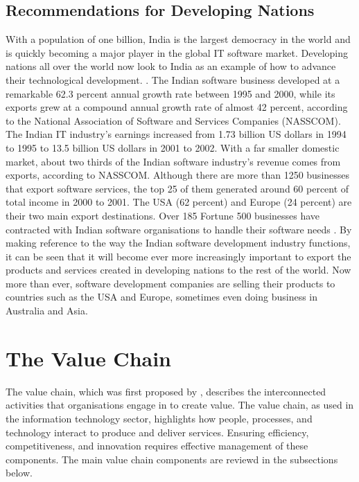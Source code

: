 \subsection{Recommendations for Developing Nations}
\par{With a population of one billion, India is the largest democracy in the world and is quickly becoming a major player in the global IT software market. Developing nations all over the world now look to India as an example of how to advance their technological development. \citep{tschang2001basic}. The Indian software business developed at a remarkable 62.3 percent annual growth rate between 1995 and 2000, while its exports grew at a compound annual growth rate of almost 42 percent, according to the National Association of Software and Services Companies (NASSCOM). The Indian IT industry's earnings increased from 1.73 billion US dollars in 1994 to 1995 to 13.5 billion US dollars in 2001 to 2002. With a far smaller domestic market, about two thirds of the Indian software industry's revenue comes from exports, according to NASSCOM. Although there are more than 1250 businesses that export software services, the top 25 of them generated around 60 percent of total income in 2000 to 2001. The USA (62 percent) and Europe (24 percent) are their two main export destinations. Over 185 Fortune 500 businesses have contracted with Indian software organisations to handle their software needs \citep{agrawal2003human}. By making reference to the way the Indian software development industry functions, it can be seen that it will become ever more increasingly important to export the products and services created in developing nations to the rest of the world. Now more than ever, software development companies are selling their products to countries such as the USA and Europe, sometimes even doing business in Australia and Asia.
}

\section{The Value Chain}
\par{The value chain, which was first proposed by \cite{porter1985value}, describes the interconnected activities that organisations engage in to create value. The value chain, as used in the information technology sector, highlights how people, processes, and technology interact to produce and deliver services. Ensuring efficiency, competitiveness, and innovation requires effective management of these components. The main value chain components are reviewd in the subsections below.}
